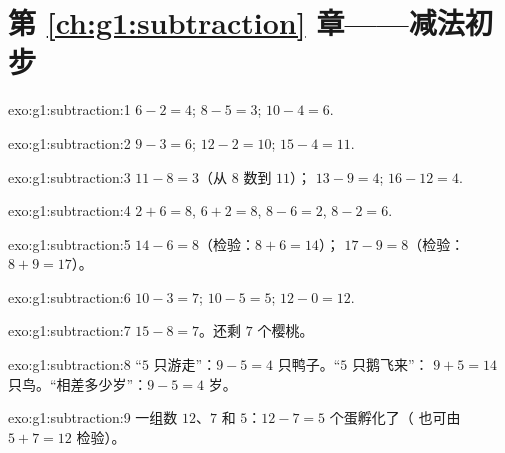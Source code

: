 \section*{第 \ref{ch:g1:subtraction} 章——减法初步}

\begin{solution}{exo:g1:subtraction:1}
$6 - 2 = 4$; \quad $8 - 5 = 3$; \quad $10 - 4 = 6$.
\end{solution}

\begin{solution}{exo:g1:subtraction:2}
$9 - 3 = 6$; \quad $12 - 2 = 10$; \quad $15 - 4 = 11$.
\end{solution}

\begin{solution}{exo:g1:subtraction:3}
$11 - 8 = 3$（从 $8$ 数到 $11$）；\quad
$13 - 9 = 4$; \quad $16 - 12 = 4$.
\end{solution}

\begin{solution}{exo:g1:subtraction:4}
$2 + 6 = 8$, \quad $6 + 2 = 8$, \quad $8 - 6 = 2$, \quad
$8 - 2 = 6$.
\end{solution}

\begin{solution}{exo:g1:subtraction:5}
$14 - 6 = 8$（检验：$8 + 6 = 14$）；\quad
$17 - 9 = 8$（检验：$8 + 9 = 17$）。
\end{solution}

\begin{solution}{exo:g1:subtraction:6}
$10 - 3 = 7$; \quad $10 - 5 = 5$; \quad $12 - 0 = 12$.
\end{solution}

\begin{solution}{exo:g1:subtraction:7}
$15 - 8 = 7$。还剩 $7$ 个樱桃。
\end{solution}

\begin{solution}{exo:g1:subtraction:8}
“$5$ 只游走”：$9 - 5 = 4$ 只鸭子。“$5$ 只鹅飞来”：
$9 + 5 = 14$ 只鸟。“相差多少岁”：$9 - 5 = 4$ 岁。
\end{solution}

\begin{solution}{exo:g1:subtraction:9}
一组数 $12$、$7$ 和 $5$：$12 - 7 = 5$ 个蛋孵化了（
也可由 $5 + 7 = 12$ 检验）。
\end{solution}
